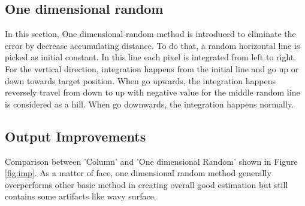 \documentclass[a4paper]{article}
\begin{document}
\subsection{One dimensional random}
In this section, One dimensional random method is introduced to eliminate the error by decrease accumulating distance. To do that, a random horizontal line is picked as initial constant. In this line each pixel is integrated from left to right. For the vertical direction, integration happens from the initial line and go up or down towards target position. When go upwards, the integration happens reversely travel from down to up with negative value for the middle random line is considered as a hill. When go downwards, the integration happens normally.
\subsection{Output Improvements}
Comparison between 'Column' and 'One dimensional Random' shown in Figure \ref{fig:imp}. As a matter of face, one dimensional random method generally overperforms other basic method in creating overall good estimation but still contains some artifacts like wavy surface.
\end{document}
